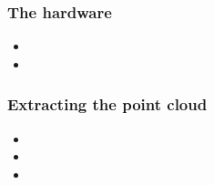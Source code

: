 \documentclass{beamer}
\begin{document}
\begin{frame}
\frametitle{The hardware} %



\begin{itemize}
	\item

	\item 
	
\end{itemize}

\end{frame}

\begin{frame}\frametitle{Extracting the point cloud}



\begin{itemize}
	\item 
	\item  
	\item 
\end{itemize}


\end{frame}
\end{document}
